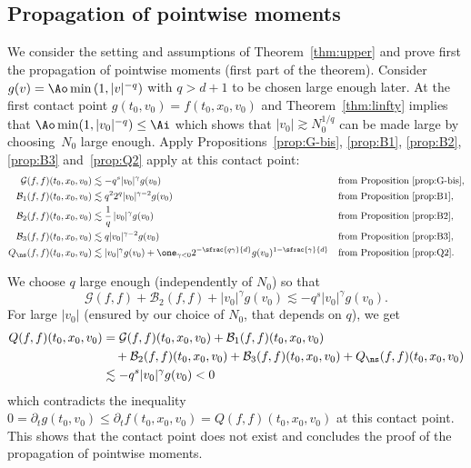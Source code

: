 \subsection{Propagation of pointwise moments}
\label{s:propag}

We consider the setting and assumptions of Theorem~\ref{thm:upper} and
prove first the propagation of pointwise moments (first part of the
theorem). Consider $g(v) = \Ao \min\left(1,|v|^{-q} \right)$ with
$q >d+1$ to be chosen large enough later. At the first contact point
$g(t_0,v_0)=f(t_0,x_0,v_0)$ and Theorem~\ref{thm:linfty} implies that
$\Ao \min(1,|v_0|^{-q}) \leq \Ai$ which shows that
$|v_0| \gtrsim N_0^{1/q}$ can be made large by choosing~$N_0$ large
enough. Apply Propositions~\ref{prop:G-bis}, \ref{prop:B1},
\ref{prop:B2}, \ref{prop:B3} and~\ref{prop:Q2} apply at this contact
point:
\begin{align*}
\mathcal G(f,f)(t_0,x_0,v_0) &\lesssim - q^s |v_0|^{\gamma} g(v_0) && \text{from Proposition } \ref{prop:G-bis},\\
\mathcal B_1 (f,f)(t_0,x_0,v_0) &\lesssim q^2 2^q |v_0|^{\gamma-2} g(v_0) && \text{from Proposition } \ref{prop:B1}, \\
\mathcal B_2 (f,f)(t_0,x_0,v_0) &\lesssim \frac 1 q \,|v_0|^\gamma g(v_0) && \text{from Proposition } \ref{prop:B2},\\
\mathcal B_3 (f,f)(t_0,x_0,v_0) &\lesssim q |v_0|^{\gamma-2} g(v_0) && \text{from Proposition } \ref{prop:B3}, \\
Q_{\ns}(f,f)(t_0,x_0,v_0) &\lesssim |v_0|^{\gamma} g(v_0) +
\one_{\gamma<0} 2^{-\sfrac{q\gamma}{d}}
g(v_0)^{1-\sfrac{\gamma}{d}} && \text{from Proposition } \ref{prop:Q2}.
\end{align*}

We choose $q$ large enough (independently of $N_0$) so that
\[
\mathcal G(f,f) + \mathcal B_2(f,f) + |v_0|^\gamma g(v_0) \lesssim - q^s |v_0|^\gamma g(v_0).
\]
For large $|v_0|$ (ensured by our choice of $N_0$, that depends on $q$), we get
\begin{align*}
Q(f,f)(t_0,x_0,v_0) &= \mathcal G(f,f)(t_0,x_0,v_0) + \mathcal B_1 (f,f)(t_0,x_0,v_0)
\\
& \quad +\mathcal B_2 (f,f)(t_0,x_0,v_0) + \mathcal B_3 (f,f)(t_0,x_0,v_0) +
Q_{\ns}(f,f)(t_0,x_0,v_0) \\
&\lesssim - q^s |v_0|^{\gamma} g(v_0) <0
\end{align*}
which contradicts the inequality
$0= \partial_t g(t_0,v_0) \le \partial_t f(t_0,x_0,v_0) =
Q(f,f)(t_0,x_0,v_0)$ at this contact point. This shows that the
contact point does not exist and concludes the proof of the
propagation of pointwise moments.

